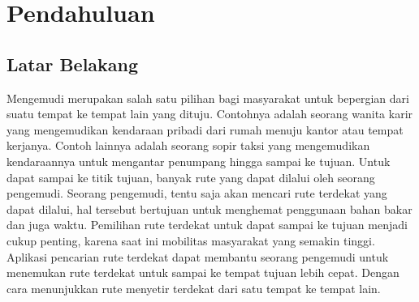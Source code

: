 \chapter{Pendahuluan}
\section{Latar Belakang}
Mengemudi merupakan salah satu pilihan bagi masyarakat untuk bepergian dari
suatu tempat ke tempat lain yang dituju. Contohnya adalah seorang wanita karir yang mengemudikan 
kendaraan pribadi dari rumah menuju kantor atau tempat kerjanya. Contoh lainnya adalah seorang sopir 
taksi yang mengemudikan kendaraannya untuk mengantar penumpang hingga sampai ke tujuan. Untuk dapat 
sampai ke titik tujuan, banyak rute yang dapat dilalui oleh seorang pengemudi. Seorang pengemudi, tentu 
saja akan mencari rute terdekat yang dapat dilalui, hal tersebut bertujuan untuk
menghemat penggunaan bahan bakar dan juga waktu. Pemilihan rute terdekat untuk dapat sampai 
ke tujuan menjadi cukup penting, karena saat ini mobilitas masyarakat yang semakin tinggi.
Aplikasi pencarian rute terdekat dapat membantu seorang pengemudi untuk menemukan rute terdekat 
untuk sampai ke tempat tujuan lebih cepat. Dengan cara menunjukkan rute menyetir terdekat dari satu 
tempat ke tempat lain. 

